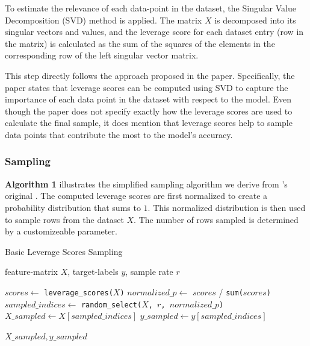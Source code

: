 \documentclass{article}
\theoremstyle{plain}
\theoremstyle{definition}
\theoremstyle{remark}
\begin{document}
To estimate the relevance of each data-point in the dataset, the Singular Value Decomposition (SVD) method is applied. The matrix $X$ is decomposed into its singular vectors and values, and the leverage score for each dataset entry (row in the matrix) is calculated as the sum of the squares of the elements in the corresponding row of the left singular vector matrix.

This step directly follows the approach proposed in the paper. Specifically, the paper states that leverage scores can be computed using SVD to capture the importance of each data point in the dataset with respect to the model. Even though the paper does not specify exactly how the leverage scores are used to calculate the final sample, it does mention that leverage scores help to sample data points that contribute the most to the model’s accuracy.


\subsubsection{Sampling}

\textbf{Algorithm 1} illustrates the simplified sampling algorithm we derive from \citeauthor{chow24}'s original \cite{chow24}. The computed leverage scores are first normalized to create a probability distribution that sums to $1$. This normalized distribution is then used to sample rows from the dataset $X$. The number of rows sampled is determined by a customizeable parameter.

\begin{algorithm}[tb]
   \caption{Basic Leverage Scores Sampling}
   \label{alg:example}
\begin{algorithmic}
    feature-matrix $X$, target-labels $y$, sample rate $r$

   \vspace{0.25cm}

   \STATE $scores \leftarrow$ \texttt{leverage\_scores($X$)}
   \STATE $normalized\_p \leftarrow$ $scores$ / \texttt{sum($scores$)}
   \STATE $sampled\_indices \leftarrow$ \texttt{random\_select($X$, $r$,  $normalized\_p$)}
   \STATE $X\_sampled \leftarrow X[sampled\_indices]$
   \STATE $y\_sampled \leftarrow y[sampled\_indices]$

   \vspace{0.25cm}

    \texttt{$X\_sampled, y\_sampled$}
\end{algorithmic}
\end{algorithm}
\end{document}
